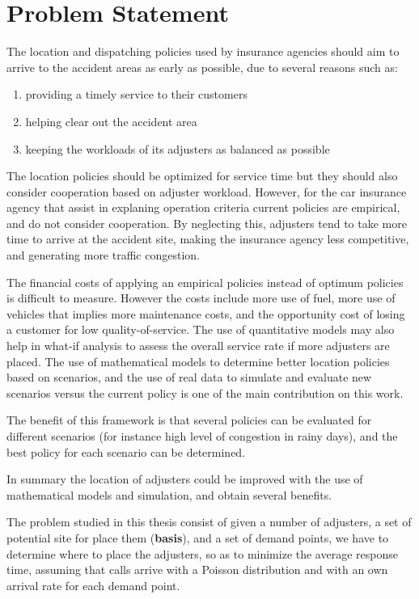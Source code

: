 \section{Problem Statement}

The location and dispatching policies
used by insurance agencies
should aim
to arrive to the accident areas
as early as possible,
due to several reasons
such as:
\begin{enumerate}
\item providing a timely service to their customers
\item helping clear out the accident area
\item keeping the workloads of its adjusters
  as balanced as possible
\end{enumerate}
The location policies
should be optimized for service time
but they should also consider
cooperation based on adjuster workload.
However,
for the car insurance agency
that assist in explaning operation criteria
current policies
are empirical,
and do not consider cooperation.
By neglecting this,
adjusters tend to take
more time to arrive at the accident site,
making the insurance agency
less competitive,
and generating more traffic congestion.

The financial costs
of applying
an empirical policies
instead of optimum policies
is difficult to measure.
However the costs include
more use of fuel,
more use of vehicles
that implies
more maintenance costs,
and the opportunity cost
of losing a customer
for low quality-of-service.
The use of quantitative models
may also help
in what-if analysis
to assess the overall service rate
if more adjusters are placed.
The use of mathematical models
to determine better location policies
based on scenarios,
and the use of real data
to simulate and evaluate new scenarios
versus the current policy
is one of the main contribution
on this work.

The benefit of this framework
is that several policies
can be evaluated for different scenarios
(for instance high level of congestion in rainy days),
and the best policy for each scenario can be determined.

In summary
the location of adjusters
could be improved
with the use of
mathematical models and simulation,
and obtain several benefits.

The problem studied in this thesis
consist of
given a number of adjusters,
a set of potential site for place them (\textbf{basis}),
and a set of demand points,
we have to determine
where to place the adjusters,
so as to minimize 
the average response time,
assuming
that calls
arrive with a Poisson distribution
and with an own arrival rate
for each demand point.
